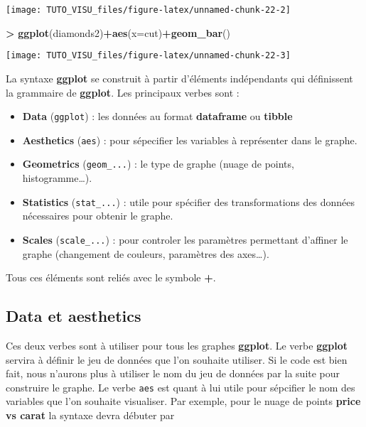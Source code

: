 \documentclass[]{book}
\newenvironment{Shaded}{\begin{snugshade}}{\end{snugshade}}
\newcommand{\DataTypeTok}[1]{\textcolor[rgb]{0.13,0.29,0.53}{#1}}
\newcommand{\KeywordTok}[1]{\textcolor[rgb]{0.13,0.29,0.53}{\textbf{#1}}}
\newcommand{\NormalTok}[1]{#1}
\newcommand{\OperatorTok}[1]{\textcolor[rgb]{0.81,0.36,0.00}{\textbf{#1}}}
\newcommand{\StringTok}[1]{\textcolor[rgb]{0.31,0.60,0.02}{#1}}
\providecommand{\tightlist}{%
  \setlength{\itemsep}{0pt}\setlength{\parskip}{0pt}}
\theoremstyle{definition}
\theoremstyle{definition}
\theoremstyle{definition}
\theoremstyle{remark}
\begin{document}
\begin{center}\texttt{[image: TUTO\_VISU\_files/figure-latex/unnamed-chunk-22-2]} \end{center}

\begin{Shaded}
\begin{Highlighting}[]
\OperatorTok{>}\StringTok{ }\KeywordTok{ggplot}\NormalTok{(diamonds2)}\OperatorTok{+}\KeywordTok{aes}\NormalTok{(}\DataTypeTok{x=}\NormalTok{cut)}\OperatorTok{+}\KeywordTok{geom_bar}\NormalTok{()}
\end{Highlighting}
\end{Shaded}

\begin{center}\texttt{[image: TUTO\_VISU\_files/figure-latex/unnamed-chunk-22-3]} \end{center}

La syntaxe \textbf{ggplot} se construit à partir d'éléments indépendants qui définissent la grammaire de \textbf{ggplot}. Les principaux verbes sont :

\begin{itemize}
\tightlist
\item
  \textbf{Data} (\texttt{ggplot}) : les données au format \textbf{dataframe} ou \textbf{tibble}
\item
  \textbf{Aesthetics} (\texttt{aes}) : pour sépecifier les variables à représenter dans le graphe.
\item
  \textbf{Geometrics} (\texttt{geom\_...}) : le type de graphe (nuage de points, histogramme\ldots{}).
\item
  \textbf{Statistics} (\texttt{stat\_...}) : utile pour spécifier des transformations des données nécessaires pour obtenir le graphe.
\item
  \textbf{Scales} (\texttt{scale\_...}) : pour controler les paramètres permettant d'affiner le graphe (changement de couleurs, paramètres des axes\ldots{}).
\end{itemize}

Tous ces éléments sont reliés avec le symbole \textbf{+}.

\hypertarget{data-et-aesthetics}{%
\subsection{Data et aesthetics}\label{data-et-aesthetics}}

Ces deux verbes sont à utiliser pour tous les graphes \textbf{ggplot}. Le verbe \textbf{ggplot} servira à définir le jeu de données que l'on souhaite utiliser. Si le code est bien fait, nous n'aurons plus à utiliser le nom du jeu de données par la suite pour construire le graphe. Le verbe \texttt{aes} est quant à lui utile pour sépcifier le nom des variables que l'on souhaite visualiser. Par exemple, pour le nuage de points \textbf{price vs carat} la syntaxe devra débuter par
\end{document}
